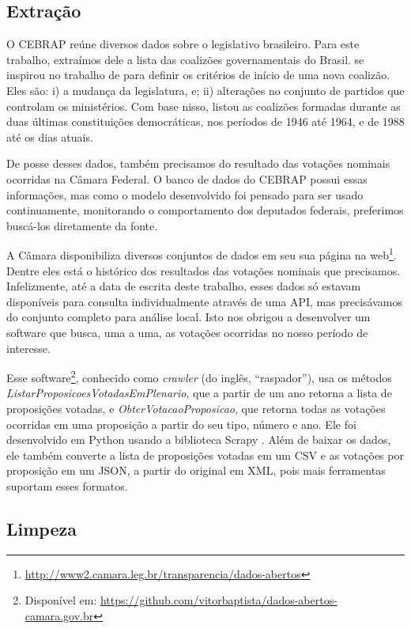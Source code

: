\documentclass[a4paper,titlepage]{ppgi}\usepackage[]{graphicx}\usepackage[]{color}
\begin{document}
\subsection{Extração}
\label{sec:miolo:extracao}

O \gls{CEBRAP} reúne diversos dados sobre o legislativo brasileiro. Para este
trabalho, extraímos dele a lista das coalizões governamentais do Brasil.
 se inspirou no trabalho de 
para definir os critérios de início de uma nova coalizão. Eles são: i) a
mudança da legislatura, e; ii) alterações no conjunto de partidos que controlam
os ministérios. Com base nisso, \citeauthor{Figueiredo2007} listou as coalizões
formadas durante as duas últimas constituições democráticas, nos períodos de
1946 até 1964, e de 1988 até os dias atuais.  

De posse desses dados, também precisamos do resultado das votações nominais
ocorridas na Câmara Federal. O banco de dados do \gls{CEBRAP} possui essas
informações, mas como o modelo desenvolvido foi pensado para ser usado
continuamente, monitorando o comportamento dos deputados federais, preferimos
buscá-los diretamente da fonte.

A Câmara disponibiliza diversos conjuntos de dados em seu sua página na
web\footnote{\url{http://www2.camara.leg.br/transparencia/dados-abertos}}.
Dentre eles está o histórico dos resultados das votações nominais que
precisamos. Infelizmente, até a data de escrita deste trabalho, esses dados só
estavam disponíveis para consulta individualmente através de uma \gls{API}, mas
precisávamos do conjunto completo para análise local.  Isto nos obrigou a
desenvolver um software que busca, uma a uma, as votações ocorridas no nosso
período de interesse.

Esse software\footnote{Disponível em:
\url{https://github.com/vitorbaptista/dados-abertos-camara.gov.br}}, conhecido
como \emph{crawler} (do inglês, ``raspador''), usa os métodos
\emph{ListarProposicoesVotadasEmPlenario}, que a partir de um ano retorna a
lista de proposições votadas, e \emph{ObterVotacaoProposicao}, que retorna
todas as votações ocorridas em uma proposição a partir do seu tipo, número e
ano. Ele foi desenvolvido em Python usando a biblioteca Scrapy
\cite{Python276,Scrapy}. Além de baixar os dados, ele também converte a lista
de proposições votadas em um \gls{CSV} e as votações por proposição em um
\gls{JSON}, a partir do original em \gls{XML}, pois mais ferramentas suportam
esses formatos.

\subsection{Limpeza}
\end{document}
